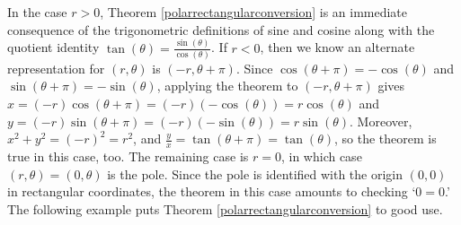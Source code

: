 \smallskip


\smallskip

In the case $r > 0$, Theorem \ref{polarrectangularconversion} is an immediate consequence of the trigonometric definitions of sine and cosine along with the quotient identity  $\tan(\theta) = \frac{\sin(\theta)}{\cos(\theta)}$. If $r < 0$, then we know an alternate representation for $(r,\theta)$ is $(-r, \theta + \pi)$. Since $\cos(\theta + \pi) = -\cos(\theta)$ and $\sin(\theta + \pi) = -\sin(\theta)$, applying the theorem to $(-r,\theta+\pi)$ gives $x = (-r) \cos(\theta + \pi) = (-r)(-\cos(\theta)) = r\cos(\theta)$ and $y = (-r) \sin(\theta + \pi) = (-r)(-\sin(\theta)) = r\sin(\theta)$.  Moreover, $x^2 + y^2 = (-r)^2 = r^2$, and $\frac{y}{x} = \tan(\theta + \pi) = \tan(\theta)$, so the theorem is true in this case, too.  The remaining case is $r = 0$, in which case $(r,\theta) = (0,\theta)$ is the pole.  Since the pole is identified with the origin $(0,0)$ in rectangular coordinates, the theorem in this case amounts to checking `$0=0$.'  The following example puts Theorem \ref{polarrectangularconversion} to good use.

\medskip

